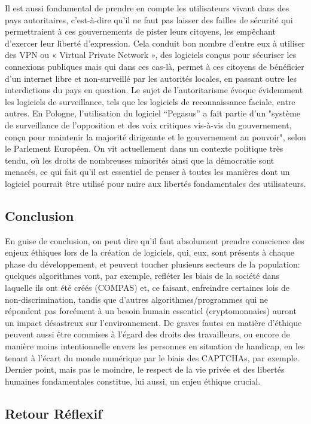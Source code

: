 \documentclass{article}
\begin{document}
Il est aussi fondamental de prendre en compte les utilisateurs vivant dans des pays autoritaires, c’est-à-dire qu’il ne faut pas laisser des failles de sécurité qui permettraient à ces gouvernements de pister leurs citoyens, les empêchant d’exercer leur liberté d’expression. Cela conduit bon nombre d’entre eux à utiliser des VPN ou « Virtual Private Network », des logiciels conçus pour sécuriser les connexions publiques mais qui dans ces cas-là, permet à ces citoyens de bénéficier d’un internet libre et non-surveillé par les autorités locales, en passant outre les interdictions du pays en question. Le sujet de l’autoritarisme évoque évidemment les logiciels de surveillance, tels que les logiciels de reconnaissance faciale, entre autres. En Pologne, l’utilisation du logiciel “Pegasus” a fait partie d’un "système de surveillance de l'opposition et des voix critiques vis-à-vis du gouvernement, conçu pour maintenir la majorité dirigeante et le gouvernement au pouvoir", selon le Parlement Européen. On vit actuellement dans un contexte politique très tendu, où les droits de nombreuses minorités ainsi que la démocratie sont menacés, ce qui fait qu’il est essentiel de penser à toutes les manières dont un logiciel pourrait être utilisé pour nuire aux libertés fondamentales des utilisateurs.\\

\subsection{Conclusion}
En guise de conclusion, on peut dire qu’il faut absolument prendre conscience des enjeux éthiques lors de la création de logiciels, qui, eux, sont présents à chaque phase du développement, et peuvent toucher plusieurs secteurs de la population: quelques algorithmes vont, par exemple, refléter les biais de la société dans laquelle ils ont été créés (COMPAS) et, ce faisant, enfreindre certaines lois de non-discrimination, tandis que d’autres algorithmes/programmes qui ne répondent pas forcément à un besoin humain essentiel (cryptomonnaies) auront un impact désastreux sur l’environnement. De graves fautes en matière d’éthique peuvent aussi être commises à l’égard des droits des travailleurs, ou encore de manière moins intentionnelle envers les personnes en situation de handicap, en les tenant à l’écart du monde numérique par le biais des CAPTCHAs, par exemple. Dernier point, mais pas le moindre, le respect de la vie privée et des libertés humaines fondamentales constitue, lui aussi, un enjeu éthique crucial. \\


\subsection{Retour Réflexif}





\end{document}
